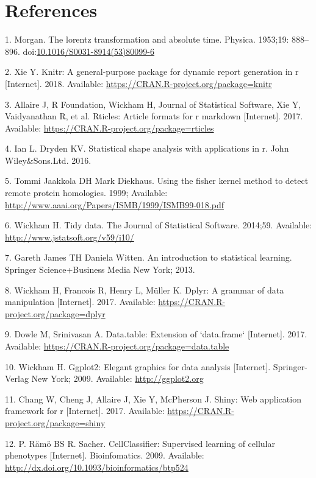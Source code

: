 \documentclass[10pt,letterpaper]{article}
\begin{document}
\newpage

\section*{References}\label{references}


\noindent

\setlength{\parindent}{-0.20in} \setlength{\leftskip}{0.20in}
\setlength{\parskip}{8pt}

\hypertarget{refs}{}
\hypertarget{ref-Sch2017}{}
1. Morgan. The lorentz transformation and absolute time. Physica.
1953;19: 888--896.
doi:\href{https://doi.org/10.1016/S0031-8914(53)80099-6}{10.1016/S0031-8914(53)80099-6}

\hypertarget{ref-pkgknitr}{}
2. Xie Y. Knitr: A general-purpose package for dynamic report generation
in r {[}Internet{]}. 2018. Available:
\url{https://CRAN.R-project.org/package=knitr}

\hypertarget{ref-pkgrticles}{}
3. Allaire J, R Foundation, Wickham H, Journal of Statistical Software,
Xie Y, Vaidyanathan R, et al. Rticles: Article formats for r markdown
{[}Internet{]}. 2017. Available:
\url{https://CRAN.R-project.org/package=rticles}

\hypertarget{ref-Dryden2016}{}
4. Ian L. Dryden KV. Statistical shape analysis with applications in r.
John Wiley\&Sons.Ltd. 2016.

\hypertarget{ref-Jaakkola1999}{}
5. Tommi Jaakkola DH Mark Diekhaus. Using the fisher kernel method to
detect remote protein homologies. 1999; Available:
\url{http://www.aaai.org/Papers/ISMB/1999/ISMB99-018.pdf}

\hypertarget{ref-pkgtidyr}{}
6. Wickham H. Tidy data. The Journal of Statistical Software. 2014;59.
Available: \url{http://www.jstatsoft.org/v59/i10/}

\hypertarget{ref-James2013}{}
7. Gareth James TH Daniela Witten. An introduction to statistical
learning. Springer Science+Business Media New York; 2013.

\hypertarget{ref-pkgdplyr}{}
8. Wickham H, Francois R, Henry L, Müller K. Dplyr: A grammar of data
manipulation {[}Internet{]}. 2017. Available:
\url{https://CRAN.R-project.org/package=dplyr}

\hypertarget{ref-pkgdatatable}{}
9. Dowle M, Srinivasan A. Data.table: Extension of `data.frame`
{[}Internet{]}. 2017. Available:
\url{https://CRAN.R-project.org/package=data.table}

\hypertarget{ref-pkgggplot2}{}
10. Wickham H. Ggplot2: Elegant graphics for data analysis
{[}Internet{]}. Springer-Verlag New York; 2009. Available:
\url{http://ggplot2.org}

\hypertarget{ref-pkgshiny}{}
11. Chang W, Cheng J, Allaire J, Xie Y, McPherson J. Shiny: Web
application framework for r {[}Internet{]}. 2017. Available:
\url{https://CRAN.R-project.org/package=shiny}

\hypertarget{ref-Pelkmanslab}{}
12. P. Rämö BS R. Sacher. CellClassifier: Supervised learning of
cellular phenotypes {[}Internet{]}. Bioinfomatics. 2009. Available:
\url{http://dx.doi.org/10.1093/bioinformatics/btp524}

\nolinenumbers
\end{document}

